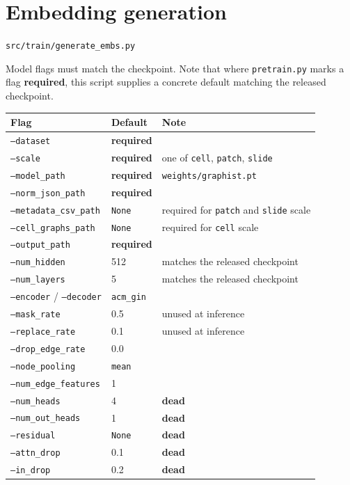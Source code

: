 \documentclass[10pt,a4paper]{article}
\newcommand{\req}{\textcolor{eosin}{\textbf{required}}}
\newcommand{\dead}{\textcolor{eosin}{\textbf{dead}}}
\begin{document}
\newpage
\section{Embedding generation}
\noindent\texttt{src/train/generate\_embs.py}

Model flags must match the checkpoint. Note that where \texttt{pretrain.py} marks
a flag \req, this script supplies a concrete default matching the released
checkpoint.

\begin{longtable}{@{}p{4.0cm}p{2.8cm}p{8.8cm}@{}}
\toprule
\textbf{Flag} & \textbf{Default} & \textbf{Note} \\
\midrule \endhead
\texttt{--dataset} & \req & \\
\texttt{--scale} & \req & one of \texttt{cell}, \texttt{patch}, \texttt{slide} \\
\texttt{--model\_path} & \req & \texttt{weights/graphist.pt} \\
\texttt{--norm\_json\_path} & \req & \\
\texttt{--metadata\_csv\_path} & \texttt{None} & required for \texttt{patch} and \texttt{slide} scale \\
\texttt{--cell\_graphs\_path} & \texttt{None} & required for \texttt{cell} scale \\
\texttt{--output\_path} & \req & \\
\texttt{--num\_hidden} & 512 & matches the released checkpoint \\
\texttt{--num\_layers} & 5 & matches the released checkpoint \\
\texttt{--encoder} / \texttt{--decoder} & \texttt{acm\_gin} & \\
\texttt{--mask\_rate} & 0.5 & unused at inference \\
\texttt{--replace\_rate} & 0.1 & unused at inference \\
\texttt{--drop\_edge\_rate} & 0.0 & \\
\texttt{--node\_pooling} & \texttt{mean} & \\
\texttt{--num\_edge\_features} & 1 & \\
\texttt{--num\_heads} & 4 & \dead \\
\texttt{--num\_out\_heads} & 1 & \dead \\
\texttt{--residual} & \texttt{None} & \dead \\
\texttt{--attn\_drop} & 0.1 & \dead \\
\texttt{--in\_drop} & 0.2 & \dead \\

\end{longtable}
\end{document}
